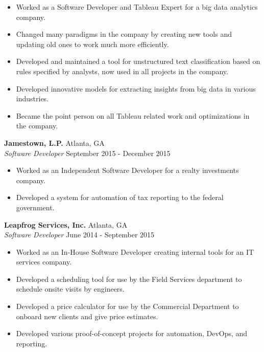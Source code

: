 \documentclass[a4paper]{article}
\begin{document}
\begin{itemize} \itemsep 1pt
	\item Worked as a Software Developer and Tableau Expert for a big data analytics company.
	\item Changed many paradigms in the company by creating new tools and updating old ones to work much more efficiently.
	\item Developed and maintained a tool for unstructured text classification based on rules specified by analysts, now used in all projects in the company.
	\item Developed innovative models for extracting insights from big data in various industries.
	\item Became the point person on all Tableau related work and optimizations in the company.
\end{itemize}
\textbf{Jamestown, L.P.} \hfill Atlanta, GA\\
\textit{Software Developer} \hfill September 2015 - December 2015\\
\vspace{-1mm}
\begin{itemize} \itemsep 1pt
	\item Worked as an Independent Software Developer for a realty investments company.
	\item Developed a system for automation of tax reporting to the federal government.
\end{itemize}
\textbf{Leapfrog Services, Inc.} \hfill Atlanta, GA\\
\textit{Software Developer} \hfill June 2014 - September 2015\\
\vspace{-1mm}
\begin{itemize} \itemsep 1pt
	\item Worked as an In-House Software Developer creating internal tools for an IT services company.
	\item Developed a scheduling tool for use by the Field Services department to schedule onsite visits by engineers.
	\item Developed a price calculator for use by the Commercial Department to onboard new clients and give price estimates.
	\item Developed various proof-of-concept projects for automation, DevOps, and reporting.
\end{itemize}
\end{document}
